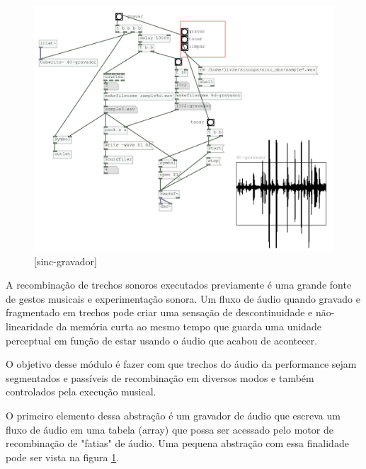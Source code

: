 \documentclass{ppgmus}
\begin{document}
\begin{figure}
\includegraphics[scale=.6]{sinc-gravador}
\caption{[sinc-gravador]}
\label{sinc-gravador}
\end{figure}



A recombinação de trechos sonoros executados previamente é uma grande fonte
de gestos musicais e experimentação sonora. Um fluxo de áudio quando gravado
e fragmentado em trechos pode criar uma sensação de descontinuidade e não-linearidade
da memória curta ao mesmo tempo que guarda uma unidade perceptual em função de estar usando
o áudio que acabou de acontecer.

O objetivo desse módulo é fazer com que trechos do áudio da performance sejam segmentados e 
passíveis de recombinação em diversos modos e também controlados pela execução musical.

O primeiro elemento dessa abstração é um gravador de áudio que escreva um fluxo
de áudio em uma tabela (array) que possa ser acessado pelo motor de recombinação de "fatias" de áudio.
Uma pequena abstração com essa finalidade pode ser vista na figura \ref{sinc-gravador}.
\end{document}
